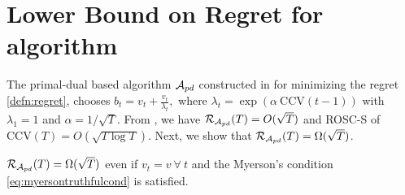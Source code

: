 \section{Lower Bound on Regret for algorithm \cite{Feng} }


The primal-dual based algorithm $\mathcal{A}_{pd}$ constructed in \cite{Feng}  for minimizing the regret \eqref{defn:regret}, chooses
$b_t = v_t+\frac{v_t}{\lambda_t},$ where 
$\lambda_t = \exp\left(\alpha \ \text{CCV}(t-1)\right)$ with $\lambda_1=1$ and $\alpha=1/\sqrt{T}$.
From \cite{Feng}, we have $\mathcal{R}_{\mathcal{A}_{pd}}(T) =O(\sqrt{T})$ and ROSC-S of $\text{CCV}(T) = O(\sqrt{T\log T})$. 
Next, we show that $\mathcal{R}_{\mathcal{A}_{pd}}(T) =\Omega(\sqrt{T})$.
\begin{lemma}\label{lem:lbApd} $\mathcal{R}_{\mathcal{A}_{pd}}(T) =\Omega(\sqrt{T})$ even if $v_t=v \ \forall \ t$ and the Myerson's condition \eqref{eq:myersontruthfulcond} is satisfied.
\end{lemma}
